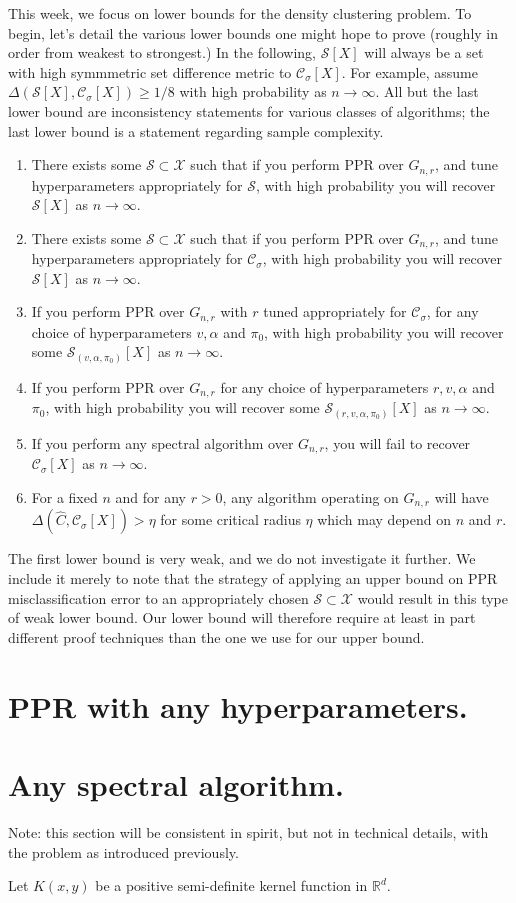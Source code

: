 \documentclass{article}
\newcommand{\Reals}{\mathbb{R}}
\newcommand{\1}{\mathbf{1}}
\newcommand{\Rd}{\Reals^d}
\newcommand{\Xbf}{X}
\newcommand{\Xset}{\mathcal{X}}
\newcommand{\Sset}{\mathcal{S}}
\newcommand{\Cset}{\mathcal{C}}
\newcommand{\Csig}{\Cset_{\sigma}}
\theoremstyle{alden}
\theoremstyle{aldenthm}
\theoremstyle{definition}
\theoremstyle{remark}
\begin{document}
This week, we focus on lower bounds for the density clustering problem. To begin, let's detail the various lower bounds one might hope to prove (roughly in order from weakest to strongest.) In the following, $\Sset[\Xbf]$ will always be a set with high symmmetric set difference metric to $\Csig[\Xbf]$. For example, assume $\Delta(\Sset[\Xbf],\Csig[\Xbf]) \geq 1/8$ with high probability as $n \to \infty$. All but the last lower bound are inconsistency statements for various classes of algorithms; the last lower bound is a statement regarding sample complexity.
\begin{enumerate}
	\item There exists some $\Sset \subset \mathcal{X}$ such that if you perform PPR over $G_{n,r}$, and tune hyperparameters appropriately for $\Sset$, with high probability you will recover $\Sset[\Xbf]$ as $n \to \infty$. 
	
	\item There exists some $\Sset \subset \mathcal{X}$ such that if you perform PPR over $G_{n,r}$, and tune hyperparameters appropriately for $\Csig$, with high probability you will recover $\Sset[\Xbf]$ as $n \to \infty$. 
	
	\item If you perform PPR over $G_{n,r}$ with $r$ tuned appropriately for $\Csig$, for any choice of hyperparameters $v, \alpha$ and $\pi_0$, with high probability you will recover some $\Sset_{(v,\alpha,\pi_0)}[\Xbf]$ as $n \to \infty$. 
	
	\item If you perform PPR over $G_{n,r}$ for any choice of hyperparameters $r, v, \alpha$ and $\pi_0$, with high probability you will recover some $\Sset_{(r, v,\alpha,\pi_0)}[\Xbf]$ as $n \to \infty$. 
	
	\item If you perform any spectral algorithm over $G_{n,r}$, you will fail to recover $\Csig[\Xbf]$ as $n \to \infty$. 
	
	\item For a fixed $n$ and for any $r > 0$, any algorithm operating on $G_{n,r}$ will have $\Delta(\widehat{C}, \Csig[\Xbf]) > \eta$ for some critical radius $\eta$ which may depend on $n$ and $r$. 
\end{enumerate}

The first lower bound is very weak, and we do not investigate it further. We include it merely to note that the strategy of applying an upper bound on PPR misclassification error to an appropriately chosen $\Sset \subset \Xset$ would result in this type of weak lower bound. Our lower bound will therefore require at least in part different proof techniques than the one we use for our upper bound.

\section{PPR with any hyperparameters.}


\section{Any spectral algorithm.}

Note: this section will be consistent in spirit, but not in technical details, with the problem as introduced previously. 

Let $K(x,y)$ be a positive semi-definite kernel function in $\Rd$. 
\end{document}
